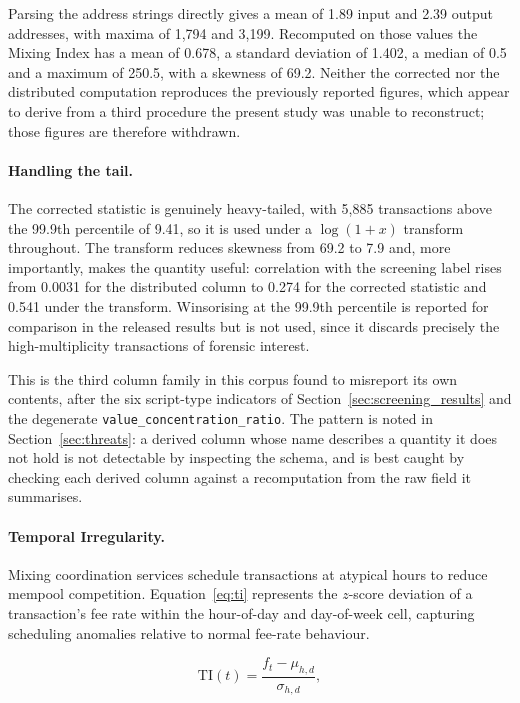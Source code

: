 \documentclass[12pt,a4paper]{article}
\begin{document}
Parsing the address strings directly gives a mean of 1.89 input
and 2.39 output addresses, with maxima of 1{,}794 and 3{,}199.
Recomputed on those values the Mixing Index has a mean of 0.678,
a standard deviation of 1.402, a median of 0.5 and a maximum of
250.5, with a skewness of 69.2. Neither the corrected nor the
distributed computation reproduces the previously reported
figures, which appear to derive from a third procedure the
present study was unable to reconstruct; those figures are
therefore withdrawn.

\paragraph{Handling the tail.}
The corrected statistic is genuinely heavy-tailed, with 5{,}885
transactions above the 99.9th percentile of 9.41, so it is used
under a $\log(1+x)$ transform throughout. The transform reduces
skewness from 69.2 to 7.9 and, more importantly, makes the
quantity useful: correlation with the screening label rises from
0.0031 for the distributed column to 0.274 for the corrected
statistic and 0.541 under the transform. Winsorising at the
99.9th percentile is reported for comparison in the released
results but is not used, since it discards precisely the
high-multiplicity transactions of forensic interest.

This is the third column family in this corpus found to
misreport its own contents, after the six script-type indicators
of Section~\ref{sec:screening_results} and the degenerate
\texttt{value\_concentration\_ratio}. The pattern is noted in
Section~\ref{sec:threats}: a derived column whose name describes
a quantity it does not hold is not detectable by inspecting the
schema, and is best caught by checking each derived column
against a recomputation from the raw field it summarises.

\paragraph{Temporal Irregularity.}
Mixing coordination services schedule transactions at
atypical hours to reduce mempool competition.
Equation~\eqref{eq:ti} represents the $z$-score deviation
of a transaction's fee rate within the hour-of-day and
day-of-week cell, capturing scheduling anomalies relative
to normal fee-rate behaviour.

\begin{equation}
  \text{TI}(t) = \frac{f_t - \mu_{h,d}}{\sigma_{h,d}},
  \label{eq:ti}
\end{equation}
\end{document}
